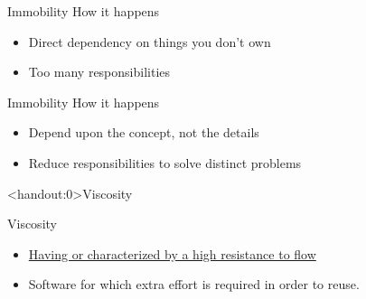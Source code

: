\documentclass[xcolor=svgnames]{beamer}
\begin{document}

{%
%
\begin{frame}{Immobility}
    How it happens
    \begin{itemize}
        \item<1-> Direct dependency on things you don't own
        \item<2-> Too many responsibilities
    \end{itemize}
\end{frame}
}


{%
%
\begin{frame}{Immobility}
    How it happens
    \begin{itemize}
        \item<1-> Depend upon the concept, not the details
        \item<2-> Reduce responsibilities to solve distinct problems
    \end{itemize}
\end{frame}
}


{%
%
\begin{frame}<handout:0>{Viscosity}
\end{frame}
}

{%
%
\begin{frame}{Viscosity}

    \begin{itemize}
        \item \href{https://www.merriam-webster.com/dictionary/viscous}
            {Having or characterized by a high resistance to flow}
        \item<2-> Software for which extra effort is required in order to reuse.
    \end{itemize}
\end{frame}
}
\end{document}
